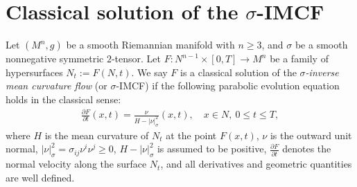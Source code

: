 \documentclass[11pt, letterpaper]{amsart}
\theoremstyle{definition}
\theoremstyle{remark}
\begin{document}
\section{Classical solution of the $\sigma $-IMCF}\label{sect-classical}

Let $(M^n, g)$ be a smooth Riemannian manifold with $n \geq 3$, and $\sigma $ be a smooth nonnegative symmetric $2$-tensor.  Let $F: N^{n-1} \times [0, T] \to M^{n}$ be a family of hypersurfaces $N_t:= F(N, t)$. We say $F$ is a classical solution of the \textit{$\sigma $-inverse mean curvature flow} (or $\sigma $-IMCF) if the following parabolic evolution equation holds in the classical sense:
\begin{align}\label{*-eq}
	\frac{\partial F}{\partial t}(x,t) = \frac{\nu }{H- |\nu |^2_{\sigma }}(x,t),\quad x \in N,\ 0 \leq t \leq T, \tag*{$(*)$}
\end{align} 
where $H$ is the mean curvature of $N_t$ at the point $F(x, t)$, $\nu $ is the outward unit normal, $|\nu |^2_{\sigma }= \sigma _{ij} \nu ^{i} \nu ^{j} \geq 0$, $H-|\nu |^2_{\sigma }$ is assumed to be positive, $\frac{\partial F}{\partial t}$ denotes the normal velocity along the surface $N_t$, and all derivatives and geometric quantities are well defined. 
\end{document}
